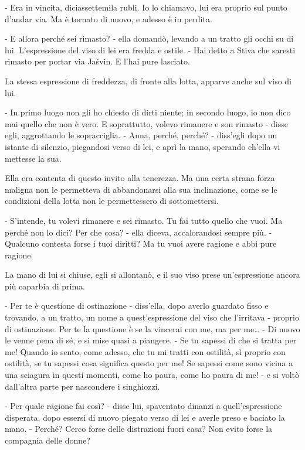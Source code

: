- Era in vincita, diciassettemila rubli. Io lo chiamavo, lui era proprio sul punto d'andar via. Ma è tornato di nuovo, e adesso è in perdita. 

- E allora perché sei rimasto? - ella domandò, levando a un tratto gli occhi su di lui. L'espressione del viso di lei era fredda e ostile. - Hai detto a Stiva che saresti rimasto per portar via Jašvin. E l'hai pure lasciato. 

La stessa espressione di freddezza, di fronte alla lotta, apparve anche sul viso di lui. 

- In primo luogo non gli ho chiesto di dirti niente; in secondo luogo, io non dico mai quello che non è vero. E soprattutto, volevo rimanere e son rimasto - disse egli, aggrottando le sopracciglia. - Anna, perché, perché? - diss'egli dopo un istante di silenzio, piegandosi verso di lei, e aprì la mano, sperando ch'ella vi mettesse la sua. 

Ella era contenta di questo invito alla tenerezza. Ma una certa strana forza maligna non le permetteva di abbandonarsi alla sua inclinazione, come se le condizioni della lotta non le permettessero di sottomettersi. 

- S'intende, tu volevi rimanere e sei rimasto. Tu fai tutto quello che vuoi. Ma perché non lo dici? Per che cosa? - ella diceva, accalorandosi sempre più. - Qualcuno contesta forse i tuoi diritti? Ma tu vuoi avere ragione e abbi pure ragione. 

La mano di lui si chiuse, egli si allontanò, e il suo viso prese un'espressione ancora più caparbia di prima. 

- Per te è questione di ostinazione - diss'ella, dopo averlo guardato fisso e trovando, a un tratto, un nome a quest'espressione del viso che l'irritava - proprio di ostinazione. Per te la questione è se la vincerai con me, ma per me\ldots{} - Di nuovo le venne pena di sé, e si mise quasi a piangere. - Se tu sapessi di che si tratta per me! Quando io sento, come adesso, che tu mi tratti con ostilità, sì proprio con ostilità, se tu sapessi cosa significa questo per me! Se sapessi come sono vicina a una sciagura in questi momenti, come ho paura, come ho paura di me! - e si voltò dall'altra parte per nascondere i singhiozzi. 

- Per quale ragione fai così? - disse lui, spaventato dinanzi a quell'espressione disperata, dopo essersi di nuovo piegato verso di lei e averle preso e baciato la mano. - Perché? Cerco forse delle distrazioni fuori casa? Non evito forse la compagnia delle donne? 


